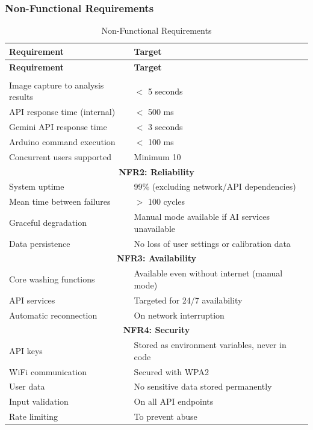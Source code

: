 \subsubsection{Non-Functional Requirements}

\begin{center}
\begin{longtable}{|p{3.5cm}|p{10cm}|}
\caption{Non-Functional Requirements}
\label{tab:nfr}\\
\hline
\textbf{Requirement} & \textbf{Target} \\
\hline
\endfirsthead

\hline
\textbf{Requirement} & \textbf{Target} \\
\hline
\endhead

\hline
\endfoot

\hline
\endlastfoot

\multicolumn{2}{|c|}{\textbf{NFR1: Performance}} \\
\hline
Image capture to analysis results & $<$ 5 seconds \\
\hline
API response time (internal) & $<$ 500 ms \\
\hline
Gemini API response time & $<$ 3 seconds \\
\hline
Arduino command execution & $<$ 100 ms \\
\hline
Concurrent users supported & Minimum 10 \\
\hline

\multicolumn{2}{|c|}{\textbf{NFR2: Reliability}} \\
\hline
System uptime & 99\% (excluding network/API dependencies) \\
\hline
Mean time between failures & $>$ 100 cycles \\
\hline
Graceful degradation & Manual mode available if AI services unavailable \\
\hline
Data persistence & No loss of user settings or calibration data \\
\hline

\multicolumn{2}{|c|}{\textbf{NFR3: Availability}} \\
\hline
Core washing functions & Available even without internet (manual mode) \\
\hline
API services & Targeted for 24/7 availability \\
\hline
Automatic reconnection & On network interruption \\
\hline

\multicolumn{2}{|c|}{\textbf{NFR4: Security}} \\
\hline
API keys & Stored as environment variables, never in code \\
\hline
WiFi communication & Secured with WPA2 \\
\hline
User data & No sensitive data stored permanently \\
\hline
Input validation & On all API endpoints \\
\hline
Rate limiting & To prevent abuse \\
\hline


\end{longtable}
\end{center}
